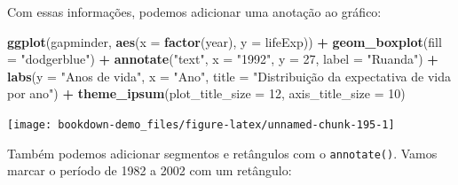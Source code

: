 \documentclass[]{book}
\newenvironment{Shaded}{\begin{snugshade}}{\end{snugshade}}
\newcommand{\KeywordTok}[1]{\textcolor[rgb]{0.13,0.29,0.53}{\textbf{#1}}}
\newcommand{\DataTypeTok}[1]{\textcolor[rgb]{0.13,0.29,0.53}{#1}}
\newcommand{\DecValTok}[1]{\textcolor[rgb]{0.00,0.00,0.81}{#1}}
\newcommand{\StringTok}[1]{\textcolor[rgb]{0.31,0.60,0.02}{#1}}
\newcommand{\OperatorTok}[1]{\textcolor[rgb]{0.81,0.36,0.00}{\textbf{#1}}}
\newcommand{\NormalTok}[1]{#1}
\begin{document}
Com essas informações, podemos adicionar uma anotação ao gráfico:

\begin{Shaded}
\begin{Highlighting}[]
\KeywordTok{ggplot}\NormalTok{(gapminder, }\KeywordTok{aes}\NormalTok{(}\DataTypeTok{x =} \KeywordTok{factor}\NormalTok{(year), }\DataTypeTok{y =}\NormalTok{ lifeExp)) }\OperatorTok{+}
\StringTok{  }\KeywordTok{geom_boxplot}\NormalTok{(}\DataTypeTok{fill =} \StringTok{"dodgerblue"}\NormalTok{) }\OperatorTok{+}
\StringTok{  }\KeywordTok{annotate}\NormalTok{(}\StringTok{"text"}\NormalTok{, }\DataTypeTok{x =} \StringTok{"1992"}\NormalTok{, }\DataTypeTok{y =} \DecValTok{27}\NormalTok{, }\DataTypeTok{label =} \StringTok{"Ruanda"}\NormalTok{) }\OperatorTok{+}
\StringTok{  }\KeywordTok{labs}\NormalTok{(}\DataTypeTok{y =} \StringTok{"Anos de vida"}\NormalTok{,}
       \DataTypeTok{x =} \StringTok{"Ano"}\NormalTok{,}
       \DataTypeTok{title =} \StringTok{"Distribuição da expectativa de vida por ano"}\NormalTok{) }\OperatorTok{+}
\StringTok{  }\KeywordTok{theme_ipsum}\NormalTok{(}\DataTypeTok{plot_title_size =} \DecValTok{12}\NormalTok{, }
              \DataTypeTok{axis_title_size =} \DecValTok{10}\NormalTok{) }
\end{Highlighting}
\end{Shaded}

\begin{center}\texttt{[image: bookdown-demo\_files/figure-latex/unnamed-chunk-195-1]} \end{center}

Também podemos adicionar segmentos e retângulos com o
\texttt{annotate()}. Vamos marcar o período de 1982 a 2002 com um
retângulo:
\end{document}

